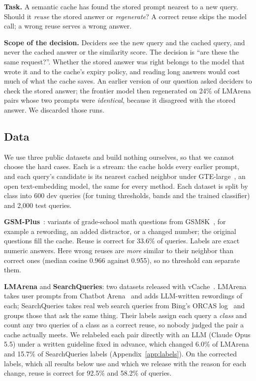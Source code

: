 \textbf{Task.} A semantic cache has found the stored prompt nearest to a new query. Should it \emph{reuse} the stored answer or \emph{regenerate}?
A correct reuse skips the model call; a wrong reuse serves a wrong answer.

\textbf{Scope of the decision.} Deciders see the new query and the cached query, and never the cached answer or the similarity score.
The decision is ``are these the same request?''.
Whether the stored answer was right belongs to the model that wrote it and to the cache's expiry policy, and reading long answers would cost much of what the cache saves.
An earlier version of our question asked deciders to check the stored answer; the frontier model then regenerated on 24\% of LMArena pairs whose two prompts were \emph{identical}, because it disagreed with the stored answer. We discarded those runs.

\subsection{Data}

We use three public datasets and build nothing ourselves, so that we cannot choose the hard cases.
Each is a stream: the cache holds every earlier prompt, and each query's candidate is its nearest cached neighbor under GTE-large~\cite{li2023gte}, an open text-embedding model, the same for every method.
Each dataset is split by class into 600 dev queries (for tuning thresholds, bands and the trained classifier) and 2,000 test queries.

\textbf{GSM-Plus}~\cite{li2024gsmplus}: variants of grade-school math questions from GSM8K~\cite{cobbe2021gsm8k}, for example a rewording, an added distractor, or a changed number; the original questions fill the cache.
Reuse is correct for 33.6\% of queries.
Labels are exact numeric answers.
Here wrong reuses are \emph{more} similar to their neighbor than correct ones (median cosine 0.966 against 0.955), so no threshold can separate them.

\textbf{LMArena} and \textbf{SearchQueries}: two datasets released with vCache~\cite{schroeder2025vcache}.
LMArena takes user prompts from Chatbot Arena~\cite{chiang2024chatbotarena} and adds LLM-written rewordings of each; SearchQueries takes real web search queries from Bing's ORCAS log~\cite{craswell2020orcas} and groups those that ask the same thing.
Their labels assign each query a \emph{class} and count any two queries of a class as a correct reuse, so nobody judged the pair a cache actually meets.
We relabeled each pair directly with an LLM (Claude Opus 5.5) under a written guideline fixed in advance, which changed 6.0\% of LMArena and 15.7\% of SearchQueries labels (Appendix~\ref*{app:labels}).
On the corrected labels, which all results below use and which we release with the reason for each change, reuse is correct for 92.5\% and 58.2\% of queries.


